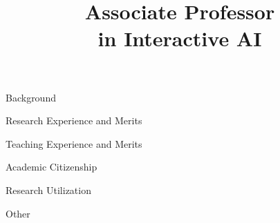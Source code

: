 \documentclass[10pt,a4paper]{moderncv} %
\title{Associate Professor \\ in Interactive AI}
\begin{document}
	\makecvtitle %
	
\begin{center} \LARGE Background\end{center}
\hline
    

    



% 



\begin{center} \LARGE  Research Experience and Merits\end{center}
\hline
    
    



\begin{center} \LARGE  Teaching Experience and Merits\end{center}
\hline
    









\begin{center} \LARGE Academic Citizenship\end{center}
\hline











\begin{center} \LARGE Research Utilization\end{center}
\hline





\begin{center} \LARGE Other\end{center}
\hline






\end{document}
